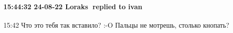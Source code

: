  
 
 
 
 

\paragraph{15:44:32 24-08-22 Loraks 🎀replied to ivan}
15:42
Что это тебя так вставило? :-O
Пальцы не мотрешь, столько кнопать?
